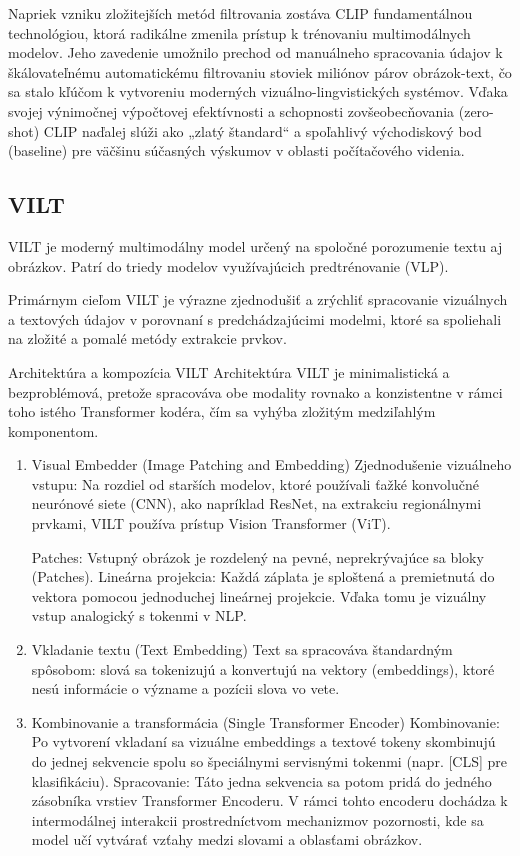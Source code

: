 \documentclass[]{tukediphc}
\begin{document}
Napriek vzniku zložitejších metód filtrovania zostáva CLIP fundamentálnou technológiou, ktorá radikálne zmenila prístup k trénovaniu multimodálnych modelov. Jeho zavedenie umožnilo prechod od manuálneho spracovania údajov k škálovateľnému automatickému filtrovaniu stoviek miliónov párov obrázok-text, čo sa stalo kľúčom k vytvoreniu moderných vizuálno-lingvistických systémov. Vďaka svojej výnimočnej výpočtovej efektívnosti a schopnosti zovšeobecňovania (zero-shot) CLIP naďalej slúži ako „zlatý štandard“ a spoľahlivý východiskový bod (baseline) pre väčšinu súčasných výskumov v oblasti počítačového videnia\cite{Finetuned_Multimodal_Language_Models_Are_High-Quality_Image-Text_Data_Filters}.

\subsection{VILT}
VILT je moderný multimodálny model určený na spoločné porozumenie textu aj obrázkov. Patrí do triedy modelov využívajúcich predtrénovanie (VLP). 

Primárnym cieľom VILT je výrazne zjednodušiť a zrýchliť spracovanie vizuálnych a textových údajov v porovnaní s predchádzajúcimi modelmi, ktoré sa spoliehali na zložité a pomalé metódy extrakcie prvkov.

Architektúra a kompozícia VILT Architektúra VILT je minimalistická a bezproblémová, pretože spracováva obe modality rovnako a konzistentne v rámci toho istého Transformer kodéra, čím sa vyhýba zložitým medziľahlým komponentom. 







\begin{enumerate}
    \item Visual Embedder (Image Patching and Embedding) Zjednodušenie vizuálneho vstupu: Na rozdiel od starších modelov, ktoré používali ťažké konvolučné neurónové siete (CNN), ako napríklad ResNet, na extrakciu regionálnymi prvkami, VILT používa prístup Vision Transformer (ViT)\cite{arxiv:2102.03334}. 
    
    Patches: Vstupný obrázok je rozdelený na pevné, neprekrývajúce sa bloky (Patches). Lineárna projekcia: Každá záplata je sploštená a premietnutá do vektora pomocou jednoduchej lineárnej projekcie. Vďaka tomu je vizuálny vstup analogický s tokenmi v NLP.
    \item Vkladanie textu (Text Embedding) Text sa spracováva štandardným spôsobom: slová sa tokenizujú a konvertujú na vektory (embeddings), ktoré nesú informácie o význame a pozícii slova vo vete. 
    \item Kombinovanie a transformácia (Single Transformer Encoder) Kombinovanie: Po vytvorení vkladaní sa vizuálne embeddings a textové tokeny skombinujú do jednej sekvencie spolu so špeciálnymi servisnými tokenmi (napr. [CLS] pre klasifikáciu)\cite{arxiv:2102.03334}. Spracovanie: Táto jedna sekvencia sa potom pridá do jedného zásobníka vrstiev Transformer Encoderu. V rámci tohto encoderu dochádza k intermodálnej interakcii prostredníctvom mechanizmov pozornosti, kde sa model učí vytvárať vzťahy medzi slovami a oblasťami obrázkov.
\end{enumerate}
\end{document}
